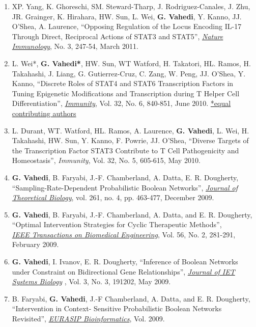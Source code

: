 \documentclass[10pt]{article}
\makeatletter
\newlength{\bibhang}
\newlength{\bibsep}
 {\@listi \global\bibsep\itemsep \global\advance\bibsep by\parsep}
\newenvironment{bibsection}%
        {\begin{enumerate}{}{%
       \setlength{\leftmargin}{\bibhang}%
       \setlength{\itemindent}{-\leftmargin}%
       \setlength{\itemsep}{\bibsep}%
       \setlength{\parsep}{\z@}%
        \setlength{\partopsep}{0pt}%
        \setlength{\topsep}{0pt}}}
        {\end{enumerate}\vspace{-0.6\baselineskip}}
\makeatother
\begin{document}
\begin{bibsection}
\item XP. Yang, K. Ghoreschi, SM. Steward-Tharp, J. Rodriguez-Canales, J. Zhu, JR. Grainger, K. Hirahara, HW. Sun, L. Wei, {{\bf{G. Vahedi}}}, Y. Kanno, JJ. O'Shea, A. Laurence, ``Opposing Regulation of the Locus Encoding IL-17 Through Direct, Reciprocal Actions of STAT3 and STAT5'', \underline {\emph{Nature Immunology}}, No. 3, 247-54, March 2011.

\item  L. Wei*, {\bf{G. Vahedi*}}, HW. Sun, WT Watford, H. Takatori, HL. Ramos, H. Takahashi, J. Liang, G. Gutierrez-Cruz, C. Zang, W. Peng, JJ. O'Shea, Y. Kanno, ``Discrete Roles of STAT4 and STAT6 Transcription Factors in Tuning Epigenetic Modifications and Transcription during T Helper Cell Differentiation'', \underline {\emph{Immunity}}, Vol. 32, No. 6, 840-851, June 2010. \underline{*equal contributing authors}

\item L. Durant, WT. Watford, HL. Ramos, A. Laurence, {\bf{G. Vahedi}}, L. Wei, H. Takahashi, HW. Sun, Y. Kanno, F. Powrie, JJ. O'Shea, ``Diverse Targets of the Transcription Factor STAT3 Contribute to T Cell Pathogenicity and Homeostasis'',  {\emph{Immunity}}, Vol. 32, No. 5, 605-615, May 2010.

\item {\bf{G. Vahedi}}, B. Faryabi, J.-F. Chamberland, A. Datta, E. R. Dougherty, ``Sampling-Rate-Dependent Probabilistic Boolean Networks'',  \underline{\emph{Journal of Theoretical Biology}}, vol. 261, no. 4, pp. 463-477, December 2009.

\item {\bf{G. Vahedi}}, B. Faryabi, J.-F. Chamberland, A. Datta, and E. R. Dougherty, ``Optimal Intervention Strategies for Cyclic Therapeutic Methods'',\\ \underline {\emph{IEEE Transactions on Biomedical Engineering}}, Vol. 56, No. 2, 281-291, February 2009.

\item {\bf{G. Vahedi}}, I. Ivanov, E. R. Dougherty, ``Inference of Boolean Networks under Constraint on Bidirectional Gene Relationships'',  \underline{\emph{Journal of IET Systems Biology}} , Vol. 3, No. 3, 191202, May 2009.

\item B. Faryabi, {\bf{G. Vahedi}}, J.-F Chamberland, A. Datta, and E. R. Dougherty, ``Intervention in Context- Sensitive Probabilistic Boolean Networks Revisited'',  \underline{\emph{EURASIP Bioinformatics}}, Vol. 2009.


\end{bibsection}
\end{document}
